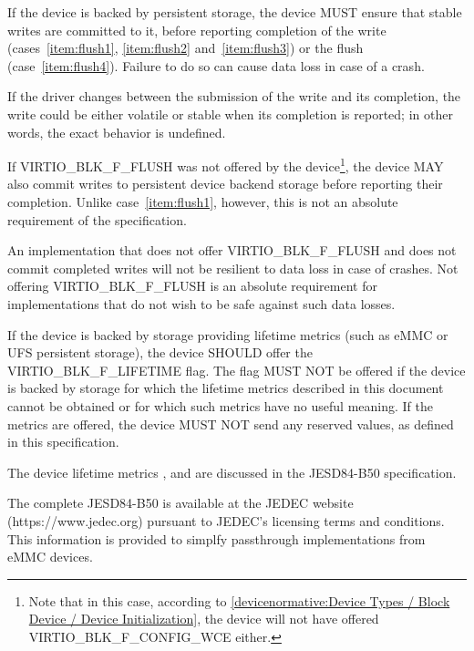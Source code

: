 If the device is backed by persistent storage, the device MUST ensure that
stable writes are committed to it, before reporting completion of the write
(cases~\ref{item:flush1}, \ref{item:flush2} and~\ref{item:flush3}) or the flush
(case~\ref{item:flush4}).  Failure to do so can cause data loss
in case of a crash.

If the driver changes  between the submission of the write
and its completion, the write could be either volatile or stable when
its completion is reported; in other words, the exact behavior is undefined.

%

If VIRTIO_BLK_F_FLUSH was not offered by the
  device\footnote{Note that in this case, according to
  \ref{devicenormative:Device Types / Block Device / Device Initialization},
  the device will not have offered VIRTIO_BLK_F_CONFIG_WCE either.}, the
device MAY also commit writes to persistent device backend storage before
reporting their completion.  Unlike case~\ref{item:flush1}, however, this
is not an absolute requirement of the specification.

\begin{note}
  An implementation that does not offer VIRTIO_BLK_F_FLUSH and does not commit
  completed writes will not be resilient to data loss in case of crashes.
  Not offering VIRTIO_BLK_F_FLUSH is an absolute requirement
  for implementations that do not wish to be safe against such data losses.
\end{note}

If the device is backed by storage providing lifetime metrics (such as eMMC
or UFS persistent storage), the device SHOULD offer the VIRTIO_BLK_F_LIFETIME
flag. The flag MUST NOT be offered if the device is backed by storage for which
the lifetime metrics described in this document cannot be obtained or for which
such metrics have no useful meaning. If the metrics are offered, the device MUST NOT
send any reserved values, as defined in this specification.

\begin{note}
  The device lifetime metrics , 
  and  are discussed in the JESD84-B50 specification.

  The complete JESD84-B50 is available at the JEDEC website (https://www.jedec.org)
  pursuant to JEDEC's licensing terms and conditions. This information is provided to
  simplfy passthrough implementations from eMMC devices.
\end{note}

